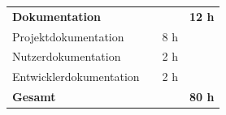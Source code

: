 \begin{tabularx}{\textwidth}{Xrrr}
\rowcolor{heading}\textbf{Dokumentation} & \textbf{} & \textbf{} & \textbf{12 h} \\
Projektdokumentation &       & 8 h & \\ 
\rowcolor{odd}Nutzerdokumentation &       & 2 h & \\ 
Entwicklerdokumentation &       & 2 h & \\ 

\hline
\hline
\rowcolor{heading}\textbf{Gesamt} & \textbf{} & \textbf{} & \textbf{80 h} \\
\end{tabularx}

